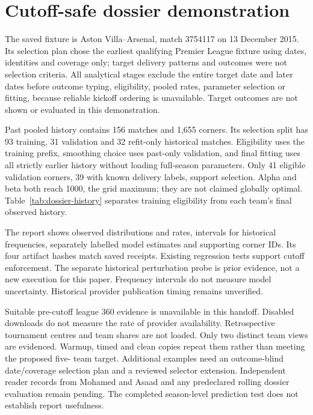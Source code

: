 \documentclass[sigconf,nonacm]{acmart}
\begin{document}
\section{Cutoff-safe dossier demonstration}
The saved fixture is Aston Villa--Arsenal, match 3754117 on 13 December 2015. Its
selection plan chose the earliest qualifying Premier League fixture using dates,
identities and coverage only; target delivery patterns and outcomes were not
selection criteria. All analytical stages exclude the entire target date and later
dates before outcome typing, eligibility, pooled rates, parameter selection or
fitting, because reliable kickoff ordering is unavailable. Target outcomes are
not shown or evaluated in this demonstration.

Past pooled history contains 156 matches and 1,655 corners. Its selection split
has 93 training, 31 validation and 32 refit-only historical matches. Eligibility
uses the training prefix, smoothing choice uses past-only validation, and final
fitting uses all strictly earlier history without loading full-season parameters.
Only 41 eligible validation corners, 39 with known delivery labels, support selection.
Alpha and beta both reach 1000, the grid maximum; they are not claimed globally
optimal. Table~\ref{tab:dossier-history} separates training eligibility from each
team's final observed history.


The report shows observed distributions and rates, intervals for historical
frequencies, separately labelled model estimates and supporting corner IDs.
Its four artifact hashes match saved receipts. Existing regression tests support
cutoff enforcement. The separate historical perturbation probe is prior evidence,
not a new execution for this paper. Frequency intervals do not measure model
uncertainty. Historical provider publication timing remains unverified.

Suitable pre-cutoff league 360 evidence is unavailable in this handoff. Disabled
downloads do not measure the rate of provider availability. Retrospective tournament
centres and team shares are not loaded. Only two distinct team views are evidenced.
Warmup, timed and clean copies repeat them rather than meeting the proposed five-
team target. Additional examples need an outcome-blind date/coverage selection
plan and a reviewed selector extension. Independent reader records from Mohamed
and Asaad and any predeclared rolling dossier evaluation remain pending. The
completed season-level prediction test does not establish report usefulness.
\end{document}
